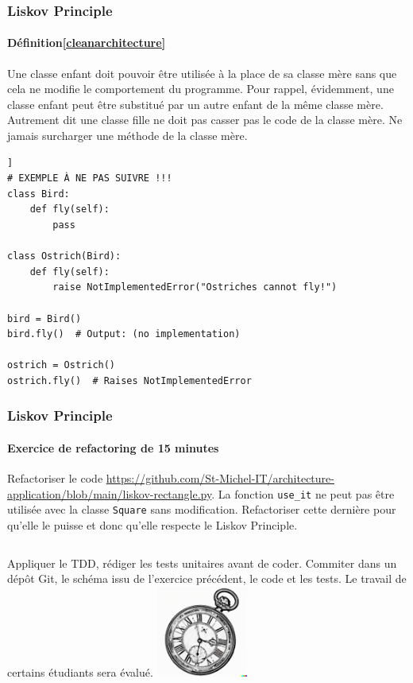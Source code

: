 \documentclass{beamer}
\begin{document}
    \begin{frame}[fragile]
        \transdissolve
        \frametitle{Liskov Principle}
        \framesubtitle{Définition\cref{cleanarchitecture}}
        Une classe enfant doit pouvoir être utilisée à la place de sa classe mère sans que cela ne modifie le comportement du programme.
        \bigbreak
        Pour rappel, évidemment, une classe enfant peut être substitué par un autre enfant de la même classe mère.
        \bigbreak
        Autrement dit une classe fille ne doit pas casser pas le code de la classe mère.
        Ne jamais surcharger une méthode de la classe mère.
        \begin{lstlisting}[basicstyle=\ttfamily\tiny]]
# EXEMPLE À NE PAS SUIVRE !!!
class Bird:
    def fly(self):
        pass

class Ostrich(Bird):
    def fly(self):
        raise NotImplementedError("Ostriches cannot fly!")

bird = Bird()
bird.fly()  # Output: (no implementation)

ostrich = Ostrich()
ostrich.fly()  # Raises NotImplementedError
        \end{lstlisting}
    \end{frame}

    \begin{frame}
        \transdissolve
        \frametitle{Liskov Principle}
        \framesubtitle{Exercice \execcounterdispinc{} de refactoring de 15 minutes}
        Refactoriser le code \url{https://github.com/St-Michel-IT/architecture-application/blob/main/liskov-rectangle.py}.
        La fonction \lstinline{use_it} ne peut pas être utilisée avec la classe \lstinline{Square} sans modification.
        Refactoriser cette dernière pour qu'elle le puisse et donc qu'elle respecte le Liskov Principle.
        \bigbreak
        \begin{columns}
            Appliquer le TDD, rédiger les tests unitaires avant de coder.
            \bigbreak
            Commiter dans un dépôt Git, le schéma issu de l'exercice précédent, le code et les tests.
            \bigbreak
            Le travail de certains étudiants sera évalué.
            \centering
            \includegraphics[width=3cm]{image/engraving-of-an-old-watch}
        \end{columns}
    \end{frame}
\end{document}
